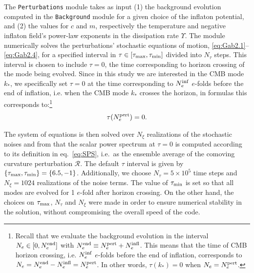 \documentclass[a4paper,11pt]{article}
\begin{document}
The \texttt{Perturbations} module takes as input (1) the background evolution computed in the \texttt{Background} module for a given choice of the inflaton potential, and (2) the values for $c$ and $m$, respectively the temperature and negative inflaton field's power-law exponents in the dissipation rate $\Upsilon$. The module numerically solves the perturbations' stochastic equations of motion, \eqref{eq:Gab2.1}--\eqref{eq:Gab2.4}, for a specified interval in $\tau\in [\tau_{\rm{max}},\tau_{\rm{min}}]$ divided into $N_\tau$ steps. This interval is chosen to include $\tau=0$, the time corresponding to horizon crossing of the mode being evolved. Since in this study we are interested in the CMB mode $k_{*}$, we specifically set $\tau=0$ at the time corresponding to $N_e^{\rm{inf}}$ $e$-folds before the end of inflation, i.e. when the CMB mode $k_{*}$ crosses the horizon, in formulas this corresponds to:\footnote{Recall that we evaluate the background evolution in the interval $N_e\in[0,N_e^{\rm{end}}]$ with $N_e^{\rm{end}}\equiv N_e^{\rm{pert}}+N_e^{\rm{infl}}$. This means that the time of CMB horizon crossing, i.e. $N_e^{\rm{inf}}$ $e$-folds before the end of inflation, corresponds to $N_e=N_e^{\rm{end}}-N_e^{\rm{infl}}=N_e^{\rm{pert}}$. In other words, $\tau(k_*)=0$ when $N_e=N_e^{\rm{pert}}$.}
\begin{equation}
    \tau(N_e^{\rm{pert}})=0.
\end{equation} 

The system of equations is then solved over $N_\xi$ realizations of the stochastic noises and from that the scalar power spectrum at $\tau=0$ is computed according to its definition in eq.~\eqref{eq:SPS},  i.e.\ as the ensemble average of the comoving curvature perturbation $\mathcal{R}$. The default $\tau$ interval is given by $\{\tau_{\rm{max}},\tau_{\rm{min}}\}=\{6.5,-1\}$. Additionally, we choose $N_\tau=5\times10^{5}$ time steps and $N_\xi=1024$ realizations of the noise terms. The value of $\tau_{\rm{min}}$ is set so that all modes are evolved for 1 $e$-fold after horizon crossing. On the other hand, the choices on $\tau_{\rm{max}}$, $N_\tau$ and $N_\xi$ were made in order to ensure numerical stability in the solution, without compromising the overall speed of the code. 
\end{document}
